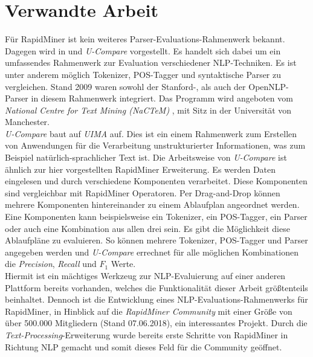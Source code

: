 %
\chapter{Verwandte Arbeit}
\label{sec:related}

Für RapidMiner ist kein weiteres Parser-Evaluations-Rahmenwerk bekannt. Dagegen wird in \cite{ucompare1} und \cite{ucompare2} \textit{U-Compare} vorgestellt. Es handelt sich dabei um ein umfassendes Rahmenwerk zur Evaluation verschiedener NLP-Techniken. Es ist unter anderem möglich Tokenizer, POS-Tagger und syntaktische Parser zu vergleichen. Stand 2009 waren sowohl der Stanford-, als auch der OpenNLP-Parser in diesem Rahmenwerk integriert. Das Programm wird angeboten vom \textit{National Centre for Text Mining (NaCTeM)} \cite{nactem}, mit Sitz in der Universität von Manchester.\\
\textit{U-Compare} baut auf \textit{UIMA} \cite{uima} auf. Dies ist ein einem Rahmenwerk zum Erstellen von Anwendungen für die Verarbeitung unstrukturierter Informationen, was zum Beispiel natürlich-sprachlicher Text ist. Die Arbeitsweise von \textit{U-Compare} ist ähnlich zur hier vorgestellten RapidMiner Erweiterung. Es werden Daten eingelesen und durch verschiedene Komponenten verarbeitet. Diese Komponenten sind vergleichbar mit RapidMiner Operatoren. Per Drag-and-Drop können mehrere Komponenten hintereinander zu einem Ablaufplan angeordnet werden. Eine Komponenten kann beispielsweise ein Tokenizer, ein POS-Tagger, ein Parser oder auch eine Kombination aus allen drei sein. Es gibt die Möglichkeit diese Ablaufpläne zu evaluieren. So können mehrere Tokenizer, POS-Tagger und Parser angegeben werden und \textit{U-Compare} errechnet für alle möglichen Kombinationen die \textit{Precision}, \textit{Recall} und \(F_1\) Werte. \cite{ucompare2} \cite{ucompareeval} \\
Hiermit ist ein mächtiges Werkzeug zur NLP-Evaluierung auf einer anderen Plattform bereits vorhanden, welches die Funktionalität dieser Arbeit größtenteils beinhaltet. Dennoch ist die Entwicklung eines NLP-Evaluations-Rahmenwerks für RapidMiner, in Hinblick auf die \textit{RapidMiner Community} mit einer Größe von über 500.000 Mitgliedern (Stand 07.06.2018), ein interessantes Projekt. %
Durch die \textit{Text-Processing}-Erweiterung wurde bereits erste Schritte von RapidMiner in Richtung NLP gemacht und somit dieses Feld für die Community geöffnet.